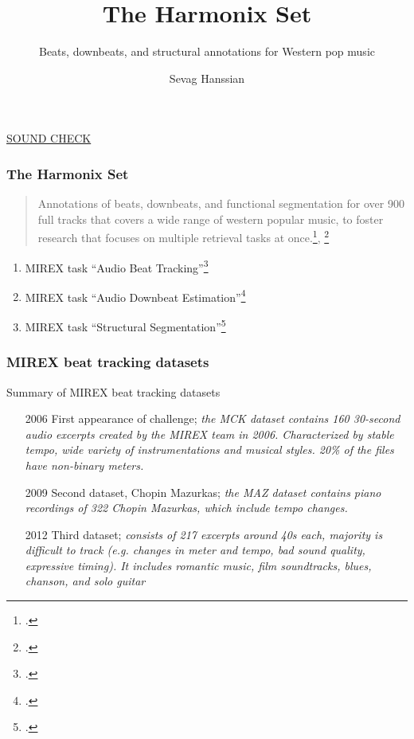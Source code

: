 \documentclass{beamer}
\title{The Harmonix Set}
\subtitle{Beats, downbeats, and structural annotations for Western pop music}
\author{Sevag Hanssian}
\institute{MUMT 621, Winter 2021}
\begin{document}
\begin{frame}
\maketitle
\href{run:./gangnam.wav}{SOUND CHECK}
\end{frame}

\begin{frame}
	\frametitle{The Harmonix Set}
	\begin{quote}
	Annotations of beats, downbeats, and functional segmentation for over 900 full tracks that covers a wide range of western popular music, to foster research that focuses on multiple retrieval tasks at once.\footcite{harmonixpaper}, \footcite{harmonixrepo}
	\end{quote}
	\begin{enumerate}
		\item
			MIREX task ``Audio Beat Tracking''\footcite{mirexabt}
		\item
			MIREX task ``Audio Downbeat Estimation''\footcite{mirexade}
		\item
			MIREX task ``Structural Segmentation''\footcite{mirexss}
	\end{enumerate}
\end{frame}


\begin{frame}
	\frametitle{MIREX beat tracking datasets}
	Summary of MIREX beat tracking datasets
	\begin{enumerate}
		\item[2006]
			First appearance of challenge; \textit{the MCK dataset contains 160 30-second audio excerpts created by the MIREX team in 2006. Characterized by stable tempo, wide variety of instrumentations and musical styles. 20\% of the files have non-binary meters.}
		\item[2009]
			Second dataset, Chopin Mazurkas; \textit{the MAZ dataset contains piano recordings of 322 Chopin Mazurkas, which include tempo changes.}
		\item[2012]
			Third dataset; \textit{consists of 217 excerpts around 40s each, majority is difficult to track (e.g. changes in meter and tempo, bad sound quality, expressive timing). It includes romantic music, film soundtracks, blues, chanson, and solo guitar}
	\end{enumerate}
\end{frame}
\end{document}
